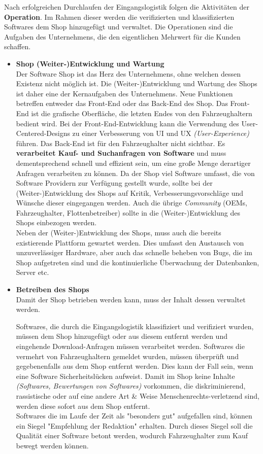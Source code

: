 Nach erfolgreichen Durchlaufen der Eingangslogistik folgen die Aktivitäten der \textbf{Operation}. Im Rahmen dieser werden die verifizierten und klassifizierten Softwares dem Shop hinzugefügt und verwaltet. Die Operationen sind die Aufgaben des Unternehmens, die den eigentlichen Mehrwert für die Kunden schaffen. 
\begin{itemize}
	\item[] \hspace{-0.6cm} \textbf{Shop (Weiter-)Entwicklung und Wartung}\\
	Der Software Shop ist das Herz des Unternehmens, ohne welchen dessen Existenz nicht möglich ist. Die (Weiter-)Entwicklung und Wartung des Shops ist daher eine der Kernaufgaben des Unternehmens. Neue Funktionen betreffen entweder das Front-End oder das Back-End des Shop. Das Front-End ist die grafische Oberfläche, die letzten Endes von den Fahrzeughaltern bedient wird. Bei der Front-End-Entwicklung kann die Verwendung des User-Centered-Designs zu einer Verbesserung von UI und UX \textit{(User-Experience)} führen. Das Back-End ist für den Fahrzeughalter nicht sichtbar. Es \textbf{verarbeitet Kauf- und Suchanfragen von Software} und muss dementsprechend schnell und effizient sein, um eine große Menge derartiger Anfragen verarbeiten zu können. Da der Shop viel Software umfasst, die von Software Providern zur Verfügung gestellt wurde, sollte bei der (Weiter-)Entwicklung des Shops auf Kritik, Verbesserungsvorschläge und Wünsche dieser eingegangen werden. Auch die übrige \textit{Community} (OEMs, Fahrzeughalter, Flottenbetreiber) sollte in die (Weiter-)Entwicklung des Shops einbezogen werden.\\
	Neben der (Weiter-)Entwicklung des Shops, muss auch die bereits existierende Plattform gewartet werden. Dies umfasst den Austausch von unzuverlässiger Hardware, aber auch das schnelle beheben von Bugs, die im Shop aufgetreten sind und die kontinuierliche Überwachung der Datenbanken, Server etc.

	\item[] \hspace{-0.6cm}\textbf{Betreiben des Shops}\\	
	Damit der Shop betrieben werden kann, muss der Inhalt dessen verwaltet werden.
	
	Softwares, die durch die Eingangslogistik klassifiziert und verifiziert wurden, müssen dem Shop hinzugefügt oder aus diesem entfernt werden und eingehende Download-Anfragen müssen verarbeitet werden. Softwares die vermehrt von Fahrzeughaltern gemeldet wurden, müssen überprüft und gegebenenfalls aus dem Shop entfernt werden. Dies kann der Fall sein, wenn eine Software Sicherheitslücken aufweist. Damit im Shop keine Inhalte \textit{(Softwares, Bewertungen von Softwares)} vorkommen, die diskriminierend, rassistische oder auf eine andere Art \& Weise Menschenrechts-verletzend sind, werden diese sofort aus dem Shop entfernt.\\
	Softwares die im Laufe der Zeit als "besonders gut" aufgefallen sind, können ein Siegel "Empfehlung der Redaktion" erhalten. Durch dieses Siegel soll die Qualität einer Software betont werden, wodurch Fahrzeughalter zum Kauf bewegt werden können. 
			

\end{itemize}
